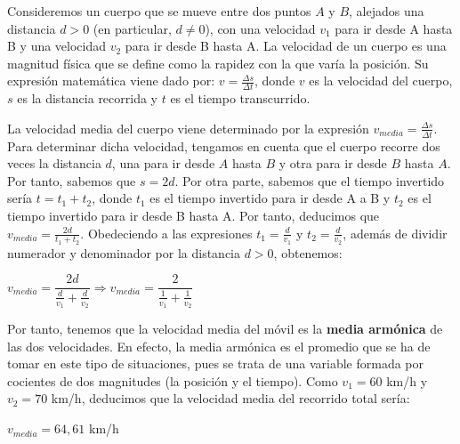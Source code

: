 Consideremos un cuerpo que se mueve entre dos puntos $A$ y $B$, alejados una distancia $d > 0$ (en particular, $d \neq 0$), con una velocidad $v_{1}$ para ir desde A hasta B y una velocidad $v_{2}$ para ir desde B hasta A. La velocidad de un cuerpo es una magnitud física que se define como la rapidez con la que varía la posición. Su expresión matemática viene dado por: $v = \frac{\Delta s}{\Delta t}$, donde $v$ es la velocidad del cuerpo, $s$ es la distancia recorrida y $t$ es el tiempo transcurrido. 

La velocidad media del cuerpo viene determinado por la expresión $v_{media} = \frac{\Delta s}{\Delta t}$. Para determinar dicha velocidad, tengamos en cuenta que el cuerpo recorre dos veces la distancia $d$, una para ir desde $A$ hasta $B$ y otra para ir desde $B$ hasta $A$. Por tanto, sabemos que $s = 2d$. Por otra parte, sabemos que el tiempo invertido sería $t = t_{1} + t_{2}$, donde $t_{1}$ es el tiempo invertido para ir desde A a B y $t_{2}$ es el tiempo invertido para ir desde B hasta A. Por tanto, deducimos que $v_{media} = \frac{2d}{t_{1} + t_{2}}$. Obedeciendo a las expresiones $t_{1} = \frac{d}{v_{1}}$ y $t_{2} = \frac{d}{v_{2}}$, además de dividir numerador y denominador por la distancia $d > 0$, obtenemos:

\begin{center}
	$v_{media} = \dfrac{2d}{\frac{d}{v_{1}} + \frac{d}{v_{2}}} 	\Rightarrow  v_{media} = \dfrac{2}{\frac{1}{v_{1}} + \frac{1}{v_{2}}}$
\end{center}

Por tanto, tenemos que la velocidad media del móvil es la \textbf{media armónica} de las dos velocidades. En efecto, la media armónica es el promedio que se ha de tomar en este tipo de situaciones, pues se trata de una variable formada por cocientes de dos magnitudes (la posición y el tiempo). Como $v_{1} = 60$ km/h y $v_{2} = 70$ km/h, deducimos que la velocidad media del recorrido total sería:

\begin{center}
	$v_{media} = 64,61$ km/h
\end{center}